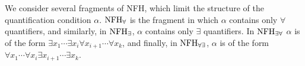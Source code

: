 We consider several fragments of NFH, which limit the structure of the quantification condition $\alpha$.
$\textrm{NFH}_{\forall}$ is the fragment in which $\alpha$ contains only $\forall$ quantifiers, 
and similarly, in $\textrm{NFH}_{\exists}$, $\alpha$ contains only $\exists$ quantifiers. In 
$\textrm{NFH}_{\exists\forall}$ $\alpha$ is of the form $\exists x_1 \cdots \exists x_i \forall 
x_{i+1}\cdots \forall x_k$, and finally, in $\textrm{NFH}_{\forall\exists}$, $\alpha$ is of the form  
$\forall x_1 \cdots \forall x_i \exists x_{i+1}\cdots \exists x_k$.





